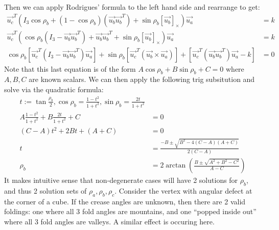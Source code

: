 \documentclass[11pt]{article}
\begin{document}
Then we can apply Rodrigues' formula to the left hand side and rearrange to get:
\begin{align}
    \vec{u_c}^T (I_3 \cos\rho_b + (1-\cos\rho_b)(\vec{u_b}\vec{u_b}^T) + \sin\rho_b {[\vec{u_b}]}_\times) \vec{u_a} &= k \\
    \vec{u_c}^T (\cos\rho_b(I_3-\vec{u_b}\vec{u_b}^T) + \vec{u_b}\vec{u_b}^T + \sin\rho_b {[\vec{u_b}]}_\times) \vec{u_a} &= k \\
    \cos\rho_b \left[ \vec{u_c}^T (I_3-\vec{u_b}\vec{u_b}^T) \vec{u_a} \right] + \sin\rho_b \left[\vec{u_c}^T (\vec{u_b}\times \vec{u_a})\right] + \left[\vec{u_c}^T (\vec{u_b}\vec{u_b}^T) \vec{u_a} - k\right]&= 0
\end{align}
Note that this last equation is of the form $A \cos\rho_b + B \sin\rho_b + C = 0$ where $A,B,C$ are known scalars. We can then apply the following trig subsitution and solve via the quadratic formula:
\begin{align} 
t := \tan\frac{\rho_b}{2}, \cos\rho_b = \frac{1-t^2}{1+t^2}, \sin\rho_b = \frac{2t}{1+t^2} \\
A \frac{1-t^2}{1+t^2} + B \frac{2t}{1+t^2} + C &= 0 \\
(C-A) t^2 + 2Bt + (A+C) &= 0 \\
t &= \frac{-B \pm \sqrt{B^2 - 4(C-A)(A+C)}}{2(C-A)} \\
\rho_b &= 2 \arctan \left(\frac{B \pm \sqrt{A^2 + B^2 - C^2}}{A-C}\right)
\end{align}
It makes intuitive sense that non-degenerate cases will have 2 solutions for $\rho_b$, and thus 2 solution sets of $\rho_a,\rho_b,\rho_c$. Consider the vertex with angular defect at the corner of a cube. If the crease angles are unknown, then there are 2 valid foldings: one where all 3 fold angles are mountains, and one ``popped inside out'' where all 3 fold angles are valleys. A similar effect is occuring here.
\end{document}
